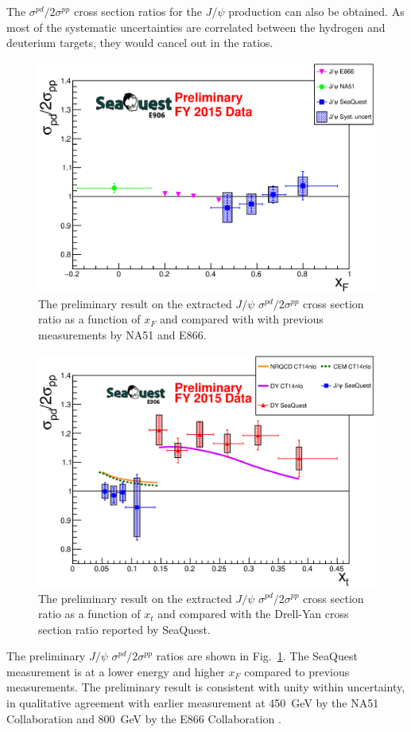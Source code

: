 \documentclass[10pt,a4paper,final]{article}
\begin{document}
The $\sigma^{pd}/2\sigma^{pp}$ cross section ratios for the $J/\psi$ production
can also be obtained. As most of the systematic uncertainties are correlated
between the hydrogen and deuterium targets, they would cancel out in the ratios.
\begin{figure}[h!]
	\centering
	\includegraphics[width=0.6\linewidth]{jPsi_all_noTheory_v2}
	\caption{The preliminary result on the extracted $J/\psi$ $\sigma^{pd}/2\sigma^{pp}$
		cross section ratio as a function of $x_F$ and compared with with previous 
		measurements by NA51 and E866.}
	\label{fig:csr}
\end{figure}
\begin{figure}[h!]
	\centering
	\includegraphics[width=0.6\linewidth]{jPsi_csr_x2_nature_NRQCD_CEM}
	\caption{The preliminary result on the extracted $J/\psi$ $\sigma^{pd}/2\sigma^{pp}$
		cross section ratio as a function of $x_t$ and compared with the Drell-Yan cross
		section ratio reported by SeaQuest.}
	\label{fig:csr_xT}
\end{figure}
The preliminary $J/\psi$ $\sigma^{pd}/2\sigma^{pp}$ ratios are shown in
Fig.~\ref{fig:csr}. The SeaQuest measurement is at a lower energy and higher $x_F$
compared to previous measurements. The preliminary result is consistent with unity
within uncertainty, in qualitative agreement with earlier measurement at \SI{450}{\GeV}
by the NA51 Collaboration \cite{abreu1998} and \SI{800}{\GeV} by the E866 Collaboration
\cite{peng2003}.
\end{document}
